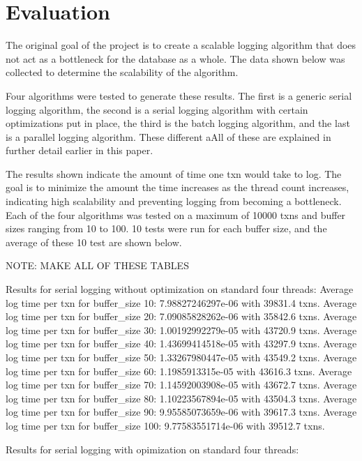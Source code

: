 \section{Evaluation}


The original goal of the project is to create a scalable logging algorithm that does not act as a bottleneck for the database as a whole. The data shown below was collected to determine the scalability of the algorithm. 

Four algorithms were tested to generate these results. The first is a generic serial logging algorithm, the second is a serial logging algorithm with certain optimizations put in place, the third is the batch logging algorithm, and the last is a parallel logging algorithm. These different aAll of these are explained in further detail earlier in this paper. \newline

The results shown indicate the amount of time one txn would take to log. The goal is to minimize the amount the time increases as the thread count increases, indicating high scalability and preventing logging from becoming a bottleneck. Each of the four algorithms was tested on a maximum of 10000 txns and buffer sizes ranging from 10 to 100. 10 tests were run for each buffer size, and the average of these 10 test are shown below. \newline 

NOTE: MAKE ALL OF THESE TABLES

Results for serial logging without optimization on standard four threads:
Average log time per txn for buffer_size 10: 7.98827246297e-06 with 39831.4 txns.
Average log time per txn for buffer_size 20: 7.09085828262e-06 with 35842.6 txns.
Average log time per txn for buffer_size 30: 1.00192992279e-05 with 43720.9 txns.
Average log time per txn for buffer_size 40: 1.43699414518e-05 with 43297.9 txns.
Average log time per txn for buffer_size 50: 1.33267980447e-05 with 43549.2 txns.
Average log time per txn for buffer_size 60: 1.1985913315e-05 with 43616.3 txns.
Average log time per txn for buffer_size 70: 1.14592003908e-05 with 43672.7 txns.
Average log time per txn for buffer_size 80: 1.10223567894e-05 with 43504.3 txns.
Average log time per txn for buffer_size 90: 9.95585073659e-06 with 39617.3 txns.
Average log time per txn for buffer_size 100: 9.77583551714e-06 with 39512.7 txns.


Results for serial logging with opimization on standard four threads:


